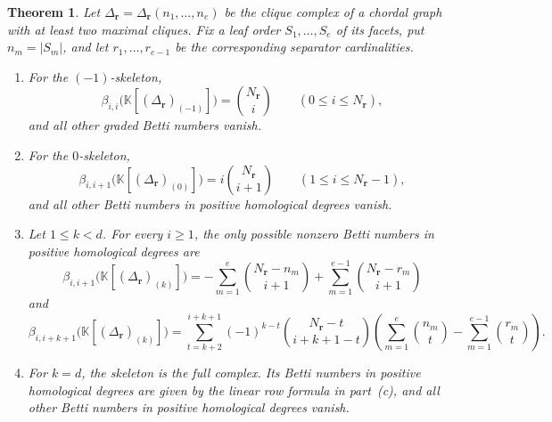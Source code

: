 \documentclass[11pt]{amsart}
\newtheorem{theorem}{Theorem}[section]
\theoremstyle{definition}
\theoremstyle{remark}
\newcommand{\K}{\mathbb K}
\newcommand{\SR}[1]{\K[#1]}
\begin{document}
	\begin{theorem}\label{thm:1}
		Let $\Delta_{\mathbf r}=\Delta_{\mathbf r}(n_1,\ldots,n_e)$ be the clique complex of a chordal graph with at least two maximal cliques. Fix a leaf order $S_1,\ldots,S_e$ of its facets, put $n_m=|S_m|$, and let $r_1,\ldots,r_{e-1}$ be the corresponding separator cardinalities.
		\begin{enumerate}
			\item[(a)] For the $(-1)$-skeleton,
			\[
			\beta_{i,i}\bigl(\SR{(\Delta_{\mathbf r})_{(-1)}}\bigr)=\binom{N_{\mathbf r}}i
			\qquad(0\le i\le N_{\mathbf r}),
			\]
			and all other graded Betti numbers vanish.
			
			\item[(b)] For the $0$-skeleton,
			\[
			\beta_{i,i+1}\bigl(\SR{(\Delta_{\mathbf r})_{(0)}}\bigr)
			=i\binom{N_{\mathbf r}}{i+1}
			\qquad(1\le i\le N_{\mathbf r}-1),
			\]
			and all other Betti numbers in positive homological degrees vanish.
			
			\item[(c)] Let $1\le k<d$. For every $i\ge1$, the only possible nonzero Betti numbers in positive homological degrees are
			\[
			\beta_{i,i+1}\bigl(\SR{(\Delta_{\mathbf r})_{(k)}}\bigr)
			=
			-\sum_{m=1}^e\binom{N_{\mathbf r}-n_m}{i+1}
			+\sum_{m=1}^{e-1}\binom{N_{\mathbf r}-r_m}{i+1}
			\]
			and
			\[
			\beta_{i,i+k+1}\bigl(\SR{(\Delta_{\mathbf r})_{(k)}}\bigr)
			=
			\sum_{t=k+2}^{i+k+1}
			(-1)^{k-t}
			\binom{N_{\mathbf r}-t}{i+k+1-t}
			\left(
			\sum_{m=1}^e\binom{n_m}{t}
			-
			\sum_{m=1}^{e-1}\binom{r_m}{t}
			\right).
			\]
			
			\item[(d)] For $k=d$, the skeleton is the full complex. Its Betti numbers in positive homological degrees are given by the linear row formula in part~(c), and all other Betti numbers in positive homological degrees vanish.
		\end{enumerate}
	\end{theorem}
	
\end{document}
